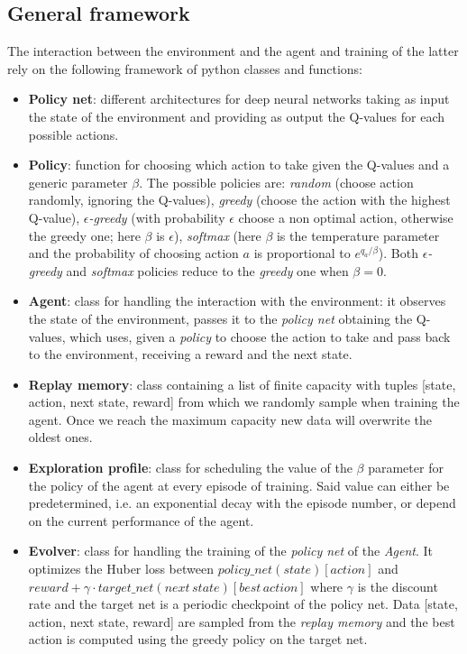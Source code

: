 \documentclass[a4paper, 11pt]{article}
\begin{document}
  \subsection{General framework}
    The interaction between the environment and the agent and training of the latter rely on the following framework of python classes and functions:
    \begin{itemize}
      \item \textbf{Policy net}: different architectures for deep neural networks taking as input the state of the environment and providing as output the Q-values for each possible actions.
      \item \textbf{Policy}: function for choosing which action to take given the Q-values and a generic parameter $\beta$. The possible policies are:
      \emph{random} (choose action randomly, ignoring the Q-values), \emph{greedy} (choose the action with the highest Q-value), \emph{$\epsilon$-greedy} (with probability $\epsilon$ choose a non optimal action, otherwise the greedy one; here $\beta$ is $\epsilon$), \emph{softmax} (here $\beta$ is the temperature parameter and the probability of choosing action $a$ is proportional to $e^{q_a/\beta}$). Both \emph{$\epsilon$-greedy} and \emph{softmax} policies reduce to the \emph{greedy} one when $\beta = 0$.
      \item \textbf{Agent}: class for handling the interaction with the environment: it observes the state of the environment, passes it to the \emph{policy net} obtaining the Q-values, which uses, given a \emph{policy} to choose the action to take and pass back to the environment, receiving a reward and the next state.
      \item \textbf{Replay memory}: class containing a list of finite capacity with tuples [state, action, next state, reward] from which we randomly sample when training the agent. Once we reach the maximum capacity new data will overwrite the oldest ones.
      \item \textbf{Exploration profile}: class for scheduling the value of the $\beta$ parameter for the policy of the agent at every episode of training. Said value can either be predetermined, i.e. an exponential decay with the episode number, or depend on the current performance of the agent.
      \item \textbf{Evolver}: class for handling the training of the \emph{policy net} of the \emph{Agent}. It optimizes the Huber loss between  $policy\_net(state)[action]$ and $reward + \gamma \cdot target\_net(next\, state)[best\, action]$ where $\gamma$ is the discount rate and the target net is a periodic checkpoint of the policy net. Data [state, action, next state, reward] are sampled from the \emph{replay memory} and the best action is computed using the greedy policy on the target net.
    \end{itemize}
\end{document}
